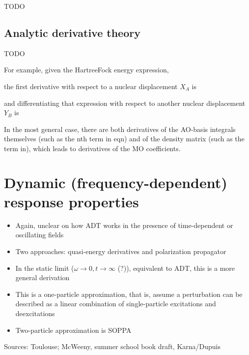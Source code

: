 \documentclass[%
class = book,%
crop = false,%
float = true,%
multi = true,%
preview = false,%
]{standalone}
\newcommand\hf{Hartree\textendash{}Fock\xspace}%
\begin{document}
TODO

\subsection{Analytic derivative theory}
\label{ssec:analytic-derivative-theory}

TODO

For example, given the \hf energy expression,

the first derivative with respect to a nuclear displacement \(X_{A}\) is

and differentiating that expression with respect to another nuclear displacement \(Y_{B}\) is

In the most general case, there are both derivatives of the AO-basis integrals themselves (such as the nth term in eqn) and of the density matrix (such as the term in), which leads to derivatives of the MO coefficients.

\section{Dynamic (frequency-dependent) response properties}

\begin{itemize}
\item Again, unclear on how ADT works in the presence of time-dependent or oscillating fields
\item Two approaches: quasi-energy derivatives and polarization propagator
\item In the static limit (\(\omega \rightarrow 0, t \rightarrow \infty\) (?)), equivalent to ADT, this is a more general derivation
\item This is a one-particle approximation, that is, assume a perturbation can be described as a linear combination of single-particle excitations and deexcitations
\item Two-particle approximation is SOPPA
\end{itemize}

Sources: Toulouse; McWeeny, summer school book draft, Karna/Dupuis

\end{document}

